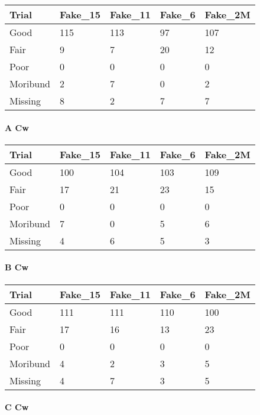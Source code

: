 \documentclass[
]{article}
\begin{document}
\begin{tabular}{l|l|l|l|l}
\hline
Trial & Fake\_15 & Fake\_11 & Fake\_6 & Fake\_2M\\
\hline
Good & 115 & 113 & 97 & 107\\
\hline
Fair & 9 & 7 & 20 & 12\\
\hline
Poor & 0 & 0 & 0 & 0\\
\hline
Moribund & 2 & 7 & 0 & 2\\
\hline
Missing & 8 & 2 & 7 & 7\\
\hline
\end{tabular}

\hypertarget{a-cw}{%
\paragraph{A Cw}\label{a-cw}}

\begin{tabular}{l|l|l|l|l}
\hline
Trial & Fake\_15 & Fake\_11 & Fake\_6 & Fake\_2M\\
\hline
Good & 100 & 104 & 103 & 109\\
\hline
Fair & 17 & 21 & 23 & 15\\
\hline
Poor & 0 & 0 & 0 & 0\\
\hline
Moribund & 7 & 0 & 5 & 6\\
\hline
Missing & 4 & 6 & 5 & 3\\
\hline
\end{tabular}

\hypertarget{b-cw}{%
\paragraph{B Cw}\label{b-cw}}

\begin{tabular}{l|l|l|l|l}
\hline
Trial & Fake\_15 & Fake\_11 & Fake\_6 & Fake\_2M\\
\hline
Good & 111 & 111 & 110 & 100\\
\hline
Fair & 17 & 16 & 13 & 23\\
\hline
Poor & 0 & 0 & 0 & 0\\
\hline
Moribund & 4 & 2 & 3 & 5\\
\hline
Missing & 4 & 7 & 3 & 5\\
\hline
\end{tabular}

\hypertarget{c-cw}{%
\paragraph{C Cw}\label{c-cw}}
\end{document}
